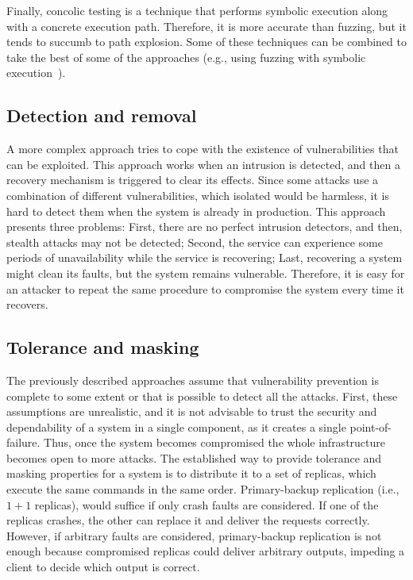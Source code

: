 Finally, concolic testing is a technique that performs symbolic execution along with a concrete execution path. 
Therefore, it is more accurate than fuzzing, but it tends to succumb to path explosion.
Some of these techniques can be combined to take the best of some of the approaches (e.g., using fuzzing with symbolic execution~\cite{Stephens:2016}).


\subsection{Detection and removal}
A more complex approach tries to cope with the existence of vulnerabilities that can be exploited.
This approach works when an intrusion is detected, and then a recovery mechanism is triggered to clear its effects. 
Since some attacks use a combination of different vulnerabilities, which isolated would be harmless, it is hard to detect them when the system is already in production. 
This approach presents three problems: 
First, there are no perfect intrusion detectors, and then, stealth attacks may not be detected; 
Second, the service can experience some periods of unavailability while the service is recovering; 
Last, recovering a system might clean its faults, but the system remains vulnerable.
Therefore, it is easy for an attacker to repeat the same procedure to compromise the system every time it recovers.


\subsection{Tolerance and masking}
The previously described approaches assume that vulnerability prevention is complete to some extent or that is possible to detect all the attacks.
First, these assumptions are unrealistic, and it is not advisable to trust the security and dependability of a system in a single component, as it creates a single point-of-failure. 
Thus, once the system becomes compromised the whole infrastructure becomes open to more attacks. 
The established way to provide tolerance and masking properties for a system is to distribute it to a set of replicas, which execute the same commands in the same order. 
Primary-backup replication (i.e., $1 + 1$ replicas), would suffice if only crash faults are considered. 
If one of the replicas crashes, the other can replace it and deliver the requests correctly.
However, if arbitrary faults are considered, primary-backup replication is not enough because compromised replicas could deliver arbitrary outputs, impeding a client to decide which output is correct.

